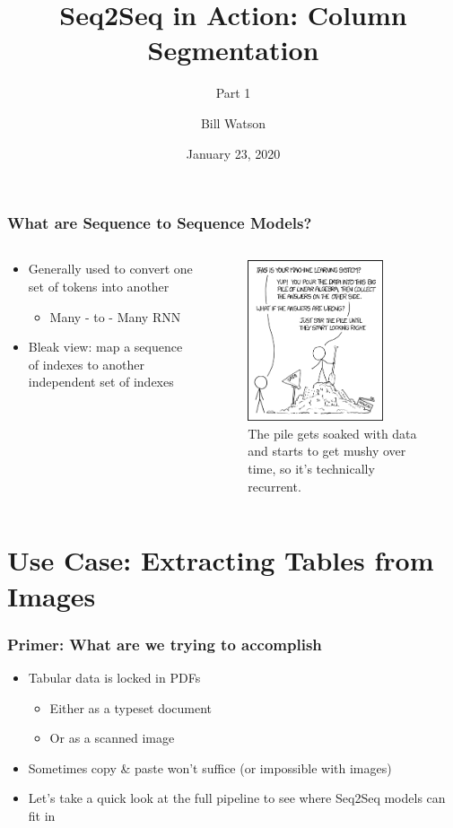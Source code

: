 \documentclass[usenames,dvipsnames]{beamer}
\title{Seq2Seq in Action: Column Segmentation}
\subtitle{Part 1}
\author{Bill Watson}
\institute{S\&P Global}
\date{January 23, 2020}
\begin{document}
\begin{frame}
\titlepage
\end{frame}


\begin{frame}
\frametitle{What are Sequence to Sequence Models?}
\begin{columns}
  \begin{column}{0.45\textwidth}
  \begin{itemize}
    \item Generally used to convert one set of tokens into another
    \begin{itemize}
      \item Many - to - Many RNN
    \end{itemize}
    \item Bleak view: map a sequence of indexes to another independent set of indexes
  \end{itemize}
  \end{column}
  \begin{column}{0.45\textwidth}
  \begin{figure}
    \includegraphics[width=4cm]{assets/machine_learning}
    \caption{The pile gets soaked with data and starts to get mushy over time, so it's technically recurrent.}
  \end{figure}
  \end{column}
\end{columns}
\end{frame}


\section{Use Case: Extracting Tables from Images}

\begin{frame}
  \frametitle{Primer: What are we trying to accomplish}
  \begin{itemize}
    \item Tabular data is locked in PDFs
    \begin{itemize}
      \item Either as a typeset document
      \item Or as a scanned image
    \end{itemize}
    \item Sometimes copy \& paste won't suffice (or impossible with images)
    \item Let's take a quick look at the full pipeline to see where Seq2Seq models can fit in
  \end{itemize}
\end{frame}
\end{document}
